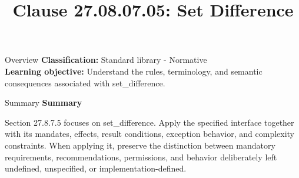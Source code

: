 \documentclass[10pt,letterpaper]{article}
\title{Clause 27.08.07.05: Set Difference}
\author{}
\date{}
\begin{document}
\maketitle
\begin{CornellOverviewBox}{Overview}
\textbf{Classification:} Standard library - Normative\\[2pt]
\textbf{Learning objective:} Understand the rules, terminology, and semantic consequences associated with set\_difference.
\end{CornellOverviewBox}\begin{CornellSummaryBox}{Summary}
{\sffamily\bfseries\color{Accent} Summary}\par\vspace{3pt}Section 27.8.7.5 focuses on set\_difference. Apply the specified interface together with its mandates, effects, result conditions, exception behavior, and complexity constraints. When applying it, preserve the distinction between mandatory requirements, recommendations, permissions, and behavior deliberately left undefined, unspecified, or implementation-defined.
\end{CornellSummaryBox}
\end{document}

